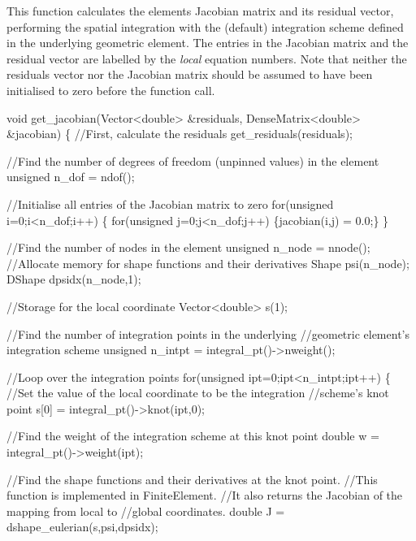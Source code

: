This function calculates the element\textquotesingle{}s Jacobian matrix and its residual vector, performing the spatial integration with the (default) integration scheme defined in the underlying geometric element. The entries in the Jacobian matrix and the residual vector are labelled by the {\itshape local} equation numbers. Note that neither the residuals vector nor the Jacobian matrix should be assumed to have been initialised to zero before the function call. 
\begin{DoxyCodeInclude}
  \textcolor{keywordtype}{void} get\_jacobian(Vector<double> &residuals, DenseMatrix<double> &jacobian)
   \{
    \textcolor{comment}{//First, calculate the residuals}
    get\_residuals(residuals);

    \textcolor{comment}{//Find the number of degrees of freedom (unpinned values) in the element}
    \textcolor{keywordtype}{unsigned} n\_dof = ndof();

    \textcolor{comment}{//Initialise all entries of the Jacobian matrix to zero}
    \textcolor{keywordflow}{for}(\textcolor{keywordtype}{unsigned} i=0;i<n\_dof;i++) 
     \{
      \textcolor{keywordflow}{for}(\textcolor{keywordtype}{unsigned} j=0;j<n\_dof;j++) \{jacobian(i,j) = 0.0;\}
     \}
    
    \textcolor{comment}{//Find the number of nodes in the element}
    \textcolor{keywordtype}{unsigned} n\_node = nnode();
    \textcolor{comment}{//Allocate memory for shape functions and their derivatives}
    Shape psi(n\_node);
    DShape dpsidx(n\_node,1);

    \textcolor{comment}{//Storage for the local coordinate}
    Vector<double> s(1);
    
    \textcolor{comment}{//Find the number of integration points in the underlying}
    \textcolor{comment}{//geometric element's integration scheme }
    \textcolor{keywordtype}{unsigned} n\_intpt = integral\_pt()->nweight();

    \textcolor{comment}{//Loop over the integration points}
    \textcolor{keywordflow}{for}(\textcolor{keywordtype}{unsigned} ipt=0;ipt<n\_intpt;ipt++)
     \{
      \textcolor{comment}{//Set the value of the local coordinate to be the integration }
      \textcolor{comment}{//scheme's knot point}
      s[0] = integral\_pt()->knot(ipt,0);

      \textcolor{comment}{//Find the weight of the integration scheme at this knot point}
      \textcolor{keywordtype}{double} w = integral\_pt()->weight(ipt);

      \textcolor{comment}{//Find the shape functions and their derivatives at the knot point. }
      \textcolor{comment}{//This function is implemented in FiniteElement.}
      \textcolor{comment}{//It also returns the Jacobian of the mapping from local to }
      \textcolor{comment}{//global coordinates.}
      \textcolor{keywordtype}{double} J = dshape\_eulerian(s,psi,dpsidx);


\end{DoxyCodeInclude}
